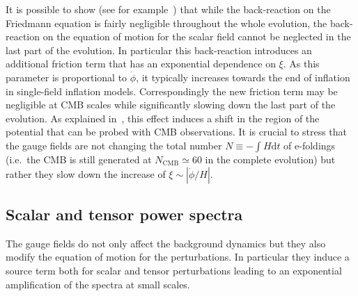 It is possible to show (see for example~\cite{Barnaby:2011vw}) that while the back-reaction on the Friedmann equation is fairly negligible throughout the whole evolution, the back-reaction on the equation of motion for the scalar field cannot be neglected in the last part of the evolution. In particular this back-reaction introduces an additional friction term that has an exponential dependence on $\xi$. As this parameter is proportional to $\dot{\phi}$, it typically increases towards the end of inflation in single-field inflation models. Correspondingly the new friction term may be negligible at CMB scales while significantly slowing down the last part of the evolution. As explained in~\cite{Domcke:2016bkh}, this effect induces a shift in the region of the potential that can be probed with CMB observations. It is crucial to stress that the gauge fields are not changing the total number $N \equiv - \int H \textrm{d}t$ of e-foldings (i.e.\ the CMB is still generated at $N_\text{CMB} \simeq 60$ in the complete evolution) but rather they slow down the increase of $\xi \sim |\dot{\phi}/H|$. 


\subsection{Scalar and tensor power spectra}
\label{review:perturbations}
The gauge fields do not only affect the background dynamics but they also modify the equation of motion for the perturbations. In particular they induce a source term both for scalar and tensor perturbations leading to an exponential amplification of the spectra at small scales. 

